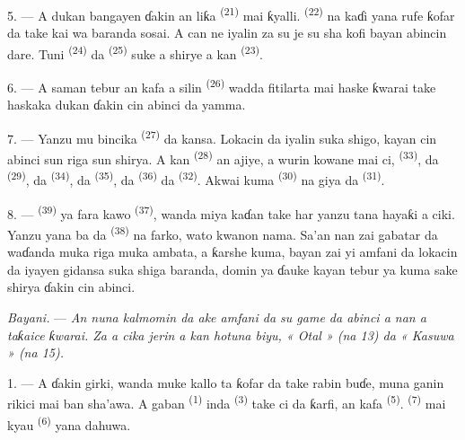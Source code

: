 \VUsaut{4.6mm}
\VUsaut{3.0mm}

5. --- A dukan bangayen ɗakin an liƙa 
\textsuperscript{(21)} mai ƙyalli. 
\textsuperscript{(22)} na kaɗi yana rufe ƙofar da take kai wa baranda
sosai. A can ne iyalin za su je su sha kofi bayan abincin dare. Tuni
 \textsuperscript{(24)} da 
\textsuperscript{(25)} suke a shirye a kan 
\textsuperscript{(23)}.

6. --- A saman tebur an kafa a silin 
\textsuperscript{(26)} wadda fitilarta mai haske ƙwarai take haskaka
dukan ɗakin cin abinci da yamma.

7. --- Yanzu mu bincika 
\textsuperscript{(27)} da kansa. Lokacin da iyalin suka shigo, kayan
cin abinci sun riga sun shirya. A kan 
\textsuperscript{(28)} an ajiye, a wurin kowane mai ci,
 \textsuperscript{(33)}, da 
\textsuperscript{(29)}, da  \textsuperscript{(34)}, da
 \textsuperscript{(35)}, da 
\textsuperscript{(36)} da  \textsuperscript{(32)}. Akwai
kuma  \textsuperscript{(30)} na giya da  \textsuperscript{(31)}.

8. ---  \textsuperscript{(39)} ya fara kawo
 \textsuperscript{(37)}, wanda miya kaɗan take har
yanzu tana hayaƙi a ciki. Yanzu yana ba da 
\textsuperscript{(38)} na farko, wato kwanon nama. Sa’an nan zai
gabatar da waɗanda muka riga muka ambata, a ƙarshe kuma, bayan
 zai yi amfani da lokacin da iyayen gidansa
suka shiga baranda, domin ya ɗauke kayan tebur ya kuma sake shirya
ɗakin cin abinci.

\textit{Bayani.} --- \textit{An nuna kalmomin da ake amfani da su
game da abinci a nan a taƙaice ƙwarai. Za a cika jerin a kan hotuna
biyu, « Otal » (na 13) da « Kasuwa » (na 15).}

\VUsaut{4.6mm}
\VUsaut{3.0mm}

1. --- A ɗakin girki, wanda muke kallo ta ƙofar da take rabin buɗe,
muna ganin rikici mai ban sha’awa. A gaban 
\textsuperscript{(1)} inda  \textsuperscript{(3)} take ci da
ƙarfi, an kafa  \textsuperscript{(5)}.
 \textsuperscript{(7)} mai kyau  \textsuperscript{(6)} yana dahuwa.

